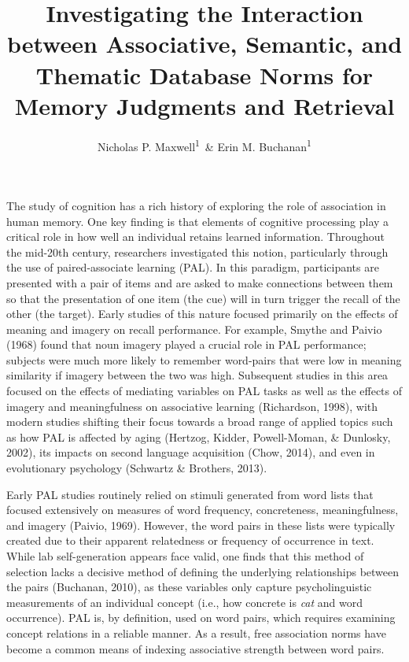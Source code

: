 \documentclass[english,man]{apa6}
\title{Investigating the Interaction between Associative, Semantic, and
Thematic Database Norms for Memory Judgments and Retrieval}
\author{Nicholas P. Maxwell\textsuperscript{1}~\& Erin M. Buchanan\textsuperscript{1}}
\affiliation{
    \vspace{0.5cm}
          \textsuperscript{1} Missouri State University  }
\theoremstyle{definition}
\theoremstyle{definition}
\theoremstyle{definition}
\theoremstyle{remark}
\begin{document}
\maketitle

\setcounter{secnumdepth}{0}



The study of cognition has a rich history of exploring the role of
association in human memory. One key finding is that elements of
cognitive processing play a critical role in how well an individual
retains learned information. Throughout the mid-20th century,
researchers investigated this notion, particularly through the use of
paired-associate learning (PAL). In this paradigm, participants are
presented with a pair of items and are asked to make connections between
them so that the presentation of one item (the cue) will in turn trigger
the recall of the other (the target). Early studies of this nature
focused primarily on the effects of meaning and imagery on recall
performance. For example, Smythe and Paivio (1968) found that noun
imagery played a crucial role in PAL performance; subjects were much
more likely to remember word-pairs that were low in meaning similarity
if imagery between the two was high. Subsequent studies in this area
focused on the effects of mediating variables on PAL tasks as well as
the effects of imagery and meaningfulness on associative learning
(Richardson, 1998), with modern studies shifting their focus towards a
broad range of applied topics such as how PAL is affected by aging
(Hertzog, Kidder, Powell-Moman, \& Dunlosky, 2002), its impacts on
second language acquisition (Chow, 2014), and even in evolutionary
psychology (Schwartz \& Brothers, 2013).

Early PAL studies routinely relied on stimuli generated from word lists
that focused extensively on measures of word frequency, concreteness,
meaningfulness, and imagery (Paivio, 1969). However, the word pairs in
these lists were typically created due to their apparent relatedness or
frequency of occurrence in text. While lab self-generation appears face
valid, one finds that this method of selection lacks a decisive method
of defining the underlying relationships between the pairs (Buchanan,
2010), as these variables only capture psycholinguistic measurements of
an individual concept (i.e., how concrete is \emph{cat} and word
occurrence). PAL is, by definition, used on word pairs, which requires
examining concept relations in a reliable manner. As a result, free
association norms have become a common means of indexing associative
strength between word pairs.
\end{document}
